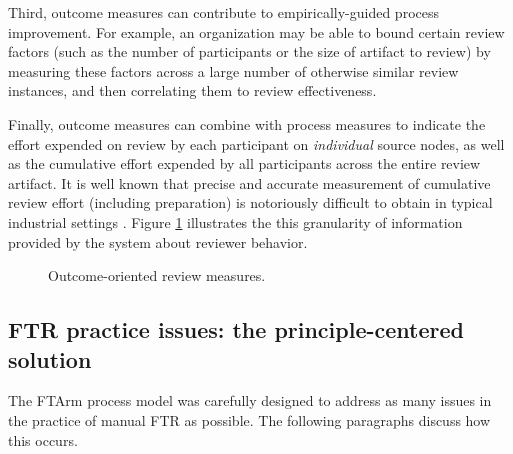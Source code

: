 Third, outcome measures can contribute to empirically-guided process
improvement.  For example, an organization may be able to bound certain
review factors (such as the number of participants or the size of artifact
to review) by measuring these factors across a large number of otherwise
similar review instances, and then correlating them to review
effectiveness.

Finally, outcome measures can combine with process measures to indicate
the effort expended on review by each participant on {\em individual}
source nodes, as well as the cumulative effort expended by all participants
across the entire review artifact. It is well known that precise and
accurate measurement of cumulative review effort (including preparation) is
notoriously difficult to obtain in typical industrial settings
\cite{Freedman90}.   Figure \ref{fig:coarse-grained} illustrates the this
granularity of information provided by the system about reviewer behavior.


\begin{figure} 
 {\centerline{}}
\caption{Outcome-oriented review measures.}
\label{fig:coarse-grained}
\end{figure}


\subsection{FTR practice issues: the principle-centered solution}
\label{sec:results}

The FTArm process model was carefully designed to address as many issues
in the practice of manual FTR as possible.  The following paragraphs
discuss how this occurs.

